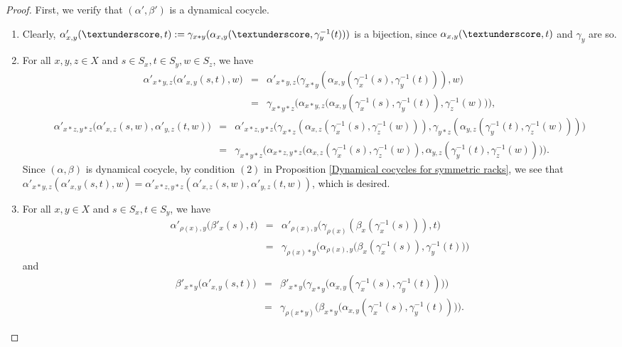 \documentclass[10pt,a4paper]{amsart}
\begin{document}
\begin{proof}
	First, we verify that $(\alpha',\beta')$ is a dynamical cocycle.
	\begin{enumerate}
		\item Clearly, $\alpha'_{x,y}(\textunderscore,t):= \gamma_{x*y}(\alpha_{x,y}(\textunderscore,\gamma_y^{-1}(t)))$ is a bijection, since $\alpha_{x,y}(\textunderscore,t)$ and $\gamma_y$ are so.
\item For all $x,y,z \in X$ and $s\in S_x,t \in S_y, w\in S_z $, we have
\begin{eqnarray*}
\alpha'_{x*y,z} \big(\alpha'_{x,y}(s,t),w \big)&=&\alpha'_{x*y,z} \big(\gamma_{x*y}(\alpha_{x,y}(\gamma_x^{-1}(s),\gamma_y^{-1}(t))),w \big)\\
&=&\gamma_{x*y*z} \big(\alpha_{x*y,z} \big(\alpha_{x,y}(\gamma_x^{-1}(s),\gamma_y^{-1}(t)),\gamma_z^{-1}(w) \big) \big),
\end{eqnarray*}
\begin{eqnarray*}
\alpha'_{x*z,y*z} \big(\alpha'_{x,z}(s,w),\alpha'_{y,z}(t,w) \big)&=& 	\alpha'_{x*z,y*z}\big(\gamma_{x*z}(\alpha_{x,z}(\gamma_x^{-1}(s),\gamma_z^{-1}(w))),\gamma_{y*z}(\alpha_{y,z}(\gamma_y^{-1}(t),\gamma_z^{-1}(w))) \big)\\
		&=&\gamma_{x*y*z} \big(\alpha_{x*z,y*z} \big(\alpha_{x,z}(\gamma_x^{-1}(s),\gamma_z^{-1}(w)),\alpha_{y,z}(\gamma_y^{-1}(t),\gamma_z^{-1}(w)) \big)\big).
	\end{eqnarray*}
Since $(\alpha,\beta)$ is dynamical cocycle, by condition $(2)$ in Proposition \ref{Dynamical cocycles for symmetric racks}, we see that $\alpha'_{x*y,z}(\alpha'_{x,y}(s,t),w)=\alpha'_{x*z,y*z}(\alpha'_{x,z}(s,w),\alpha'_{y,z}(t,w))$, which is desired.
\item For all $x,y \in X$ and $s\in S_x,t \in S_y $, we have
\begin{eqnarray*}	
	\alpha'_{\rho(x),y} \big(\beta'_x(s),t \big)&=&\alpha'_{\rho(x),y} \big(\gamma_{\rho(x)}(\beta_x(\gamma_x^{-1}(s))),t \big)\\
	&=&\gamma_{\rho(x)*y} \big(\alpha_{\rho(x),y} \big(\beta_x(\gamma_x^{-1}(s)),\gamma_y^{-1}(t) \big) \big)
\end{eqnarray*}	
and
\begin{eqnarray*}	
	\beta'_{x*y} \big(\alpha'_{x,y}(s,t) \big)&=&\beta'_{x*y} \big(\gamma_{x*y}\big(\alpha_{x,y}(\gamma_x^{-1}(s),\gamma_y^{-1}(t)) \big) \big)\\
	&=&\gamma_{\rho(x*y)} \big(\beta_{x*y}\big(\alpha_{x,y}(\gamma_x^{-1}(s),\gamma_y^{-1}(t))\big)\big).
\end{eqnarray*}

\end{enumerate}
\end{proof}
\end{document}

